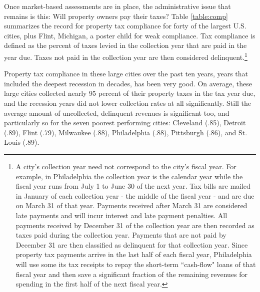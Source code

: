 \documentclass[12pt,titlepage]{article}
\begin{document}
Once market-based assessments are in place, the administrative issue
that remains is this: Will property owners pay their taxes?  Table
\ref{table:comp} summarizes the record for property tax compliance for
forty of the largest U.S. cities, plus Flint, Michigan, a poster child
for weak compliance.  Tax compliance is defined as the percent of
taxes levied in the collection year that are paid in the year due.
Taxes not paid in the collection year are then considered
delinquent.\footnote{A city's collection year need not correspond to
  the city's fiscal year.  For example, in Philadelphia the collection
  year is the calendar year while the fiscal year runs from July 1 to
  June 30 of the next year.  Tax bills are mailed in January of each
  collection year - the middle of the fiscal year - and are due on
  March 31 of that year.  Payments received after March 31 are
  considered late payments and will incur interest and late payment
  penalties.  All payments received by December 31 of the collection
  year are then recorded as taxes paid during the collection year.
  Payments that are not paid by December 31 are then classified as
  delinquent for that collection year.  Since property tax payments
  arrive in the last half of each fiscal year, Philadelphia will use
  some its tax receipts to repay the short-term ``cash-flow" loans of
  that fiscal year and then save a significant fraction of the
  remaining revenues for spending in the first half of the next fiscal
  year.}

Property tax compliance in these large cities over the past ten years,
years that included the deepest recession in decades, has been very
good.  On average, these large cities collected nearly 95 percent of
their property taxes in the tax year due, and the recession years did
not lower collection rates at all significantly.  Still the average
amount of uncollected, delinquent revenues is significant too, and
particularly so for the seven poorest performing cities: Cleveland
(.85), Detroit (.89), Flint (.79), Milwaukee (.88), Philadelphia
(.88), Pittsburgh (.86), and St. Louis (.89).
\end{document}
